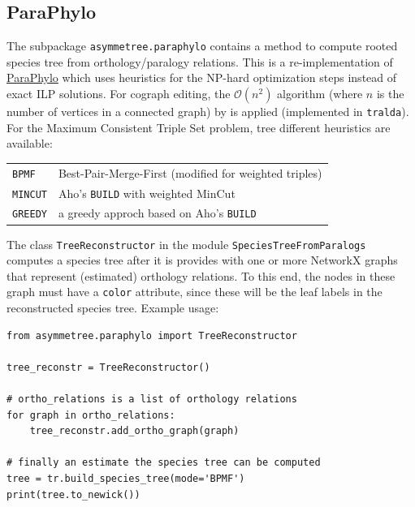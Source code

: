 \documentclass[hidelinks,11pt]{article}
\newcommand{\sq}{\textquotesingle}
\begin{document}
\subsection{ParaPhylo}

The subpackage \texttt{asymmetree.paraphylo} contains a method to compute 
rooted species tree from orthology/paralogy relations.
This is a re-implementation of 
\href{http://pacosy.informatik.uni-leipzig.de/208-0-ParaPhylo.html}{ParaPhylo} 
\citep{hellmuth2015} which uses heuristics for the NP-hard optimization steps 
instead of exact ILP solutions.
For cograph editing, the $\mathcal{O}(n^2)$ algorithm (where $n$ is the number 
of vertices in a connected graph) by \citet{crespelle2019} is applied 
(implemented in \texttt{tralda}).
For the Maximum Consistent Triple Set problem, tree different heuristics are available:

\vspace{3mm}
{\small\centering
\begin{longtable}{ p{2.5cm} p{9cm} }
	\texttt{BPMF} & Best-Pair-Merge-First \citep{wu2004} (modified for weighted triples)\\
	\texttt{MINCUT} & Aho's \texttt{BUILD} with weighted MinCut \citep{aho1981,byrka2010}\\
	\texttt{GREEDY} & a greedy approch based on Aho's \texttt{BUILD}\\
\end{longtable}
}
\vspace{3mm}

The class \texttt{TreeReconstructor} in the module \texttt{SpeciesTreeFromParalogs} computes a species tree after it is provides with one or more NetworkX graphs that represent (estimated) orthology relations.
To this end, the nodes in these graph must have a \texttt{\sq color\sq}
attribute, since these will be the leaf labels in the reconstructed species
tree.
Example usage:

\begin{adjustwidth}{1cm}{1cm}\vspace{2mm}
\begin{verbatim}
from asymmetree.paraphylo import TreeReconstructor

tree_reconstr = TreeReconstructor()

# ortho_relations is a list of orthology relations
for graph in ortho_relations:
    tree_reconstr.add_ortho_graph(graph)

# finally an estimate the species tree can be computed
tree = tr.build_species_tree(mode='BPMF')
print(tree.to_newick())
\end{verbatim}
\end{adjustwidth}
\end{document}

